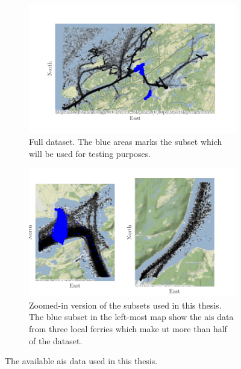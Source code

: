 \begin{figure}
    \centering
    \begin{subfigure}{\textwidth}
        \centering
        \includegraphics{figures/ais_map.pdf}
        \caption{Full dataset. The blue areas marks the subset which will be used for testing purposes.}
    \end{subfigure}
    \begin{subfigure}{\textwidth}
        \centering
        \includegraphics{figures/ais_map_zoom.pdf}
        \caption{Zoomed-in version of the subsets used in this thesis. The blue subset in the left-most map show the \acrshort{ais} data from three local ferries which make ut more than half of the dataset.}
    \end{subfigure}
    \caption{The available \acrshort{ais} data used in this thesis. }
    \label{fig:ais_data}
\end{figure}

